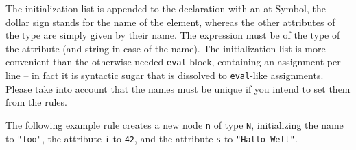 The initialization list is appended to the declaration with an at-Symbol, the dollar sign stands for the name of the element, whereas the other attributes of the type are simply given by their name. 
The expression must be of the type of the attribute (and string in case of the name). 
The initialization list is more convenient than the otherwise needed \texttt{eval} block, containing an assignment per line -- in fact it is syntactic sugar that is dissolved to \texttt{eval}-like assignments. 
Please take into account that the names must be unique if you intend to set them from the rules.

\begin{example}
The following example rule creates a new node \texttt{n} of type \texttt{N}, initializing the name to \texttt{"foo"}, the attribute \texttt{i} to \texttt{42}, and the attribute \texttt{s} to \texttt{"Hallo Welt"}.
\end{example}

